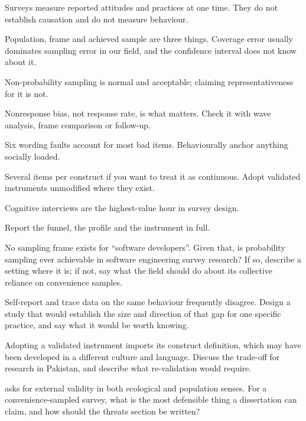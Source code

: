 \begin{chaptersummary}
\begin{tight}
  \item Surveys measure reported attitudes and practices at one time. They do
    not establish causation and do not measure behaviour.
  \item Population, frame and achieved sample are three things. Coverage error
    usually dominates sampling error in our field, and the confidence interval
    does not know about it.
  \item Non-probability sampling is normal and acceptable; claiming
    representativeness for it is not.
  \item Nonresponse bias, not response rate, is what matters. Check it with
    wave analysis, frame comparison or follow-up.
  \item Six wording faults account for most bad items. Behaviourally anchor
    anything socially loaded.
  \item Several items per construct if you want to treat it as continuous.
    Adopt validated instruments unmodified where they exist.
  \item Cognitive interviews are the highest-value hour in survey design.
  \item Report the funnel, the profile and the instrument in full.
\end{tight}
\end{chaptersummary}

\begin{reviewq}
  \item No sampling frame exists for ``software developers''. Given that, is
    probability sampling ever achievable in software engineering survey
    research? If so, describe a setting where it is; if not, say what the field
    should do about its collective reliance on convenience samples.
  \item Self-report and trace data on the same behaviour frequently disagree.
    Design a study that would establish the size and direction of that gap for
    one specific practice, and say what it would be worth knowing.
  \item Adopting a validated instrument imports its construct definition, which
    may have been developed in a different culture and language. Discuss the
    trade-off for research in Pakistan, and describe what re-validation would
    require.
  \item {} asks for external validity in both
    ecological and population senses. For a convenience-sampled survey, what is
    the most defensible thing a dissertation can claim, and how should the
    threats section be written?
\end{reviewq}
